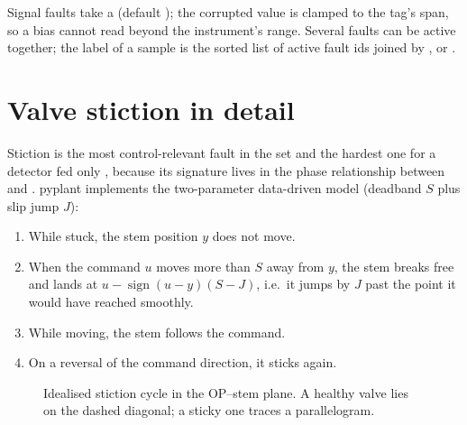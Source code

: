 Signal faults take a  (default ); the corrupted value is
clamped to the tag's span, so a bias cannot read beyond the instrument's
range. Several faults can be active together; the label of a sample is the
sorted list of active fault ids joined by \code{+}, or .

\section{Valve stiction in detail}

Stiction is the most control-relevant fault in the set and the hardest one
for a detector fed only , because its signature lives in the phase
relationship between  and . pyplant implements the
two-parameter data-driven model (deadband $S$ plus slip jump $J$):

\begin{enumerate}
  \item While stuck, the stem position $y$ does not move.
  \item When the command $u$ moves more than $S$ away from $y$, the stem
        breaks free and lands at $u - \operatorname{sign}(u-y)(S-J)$, i.e.\
        it jumps by $J$ past the point it would have reached smoothly.
  \item While moving, the stem follows the command.
  \item On a reversal of the command direction, it sticks again.
\end{enumerate}

\begin{figure}[htbp]
\centering
{}
\caption{Idealised stiction cycle in the OP--stem plane. A healthy valve lies
on the dashed diagonal; a sticky one traces a parallelogram.}
\label{fig:stiction}
\end{figure}

